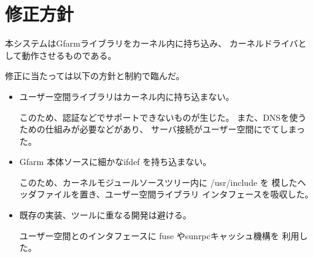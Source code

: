 \section{修正方針}
	本システムはGfarmライブラリをカーネル内に持ち込み、
	カーネルドライバとして動作させるものである。

	修正に当たっては以下の方針と制約で臨んだ。
	\begin{itemize}
	\item	ユーザー空間ライブラリはカーネル内に持ち込まない。

		このため、認証などでサポートできないものが生じた。
		また、DNSを使うための仕組みが必要などがあり、
		サーバ接続がユーザー空間にでてしまった。

	\item	Gfarm 本体ソースに細かなifdef を持ち込まない。

		このため、カーネルモジュールソースツリー内に /usr/include を
		模したヘッダファイルを置き、ユーザー空間ライブラリ
		インタフェースを吸収した。

	\item	既存の実装、ツールに重なる開発は避ける。

		ユーザー空間とのインタフェースに fuse やsunrpcキャッシュ機構を
		利用した。
	\end{itemize}
